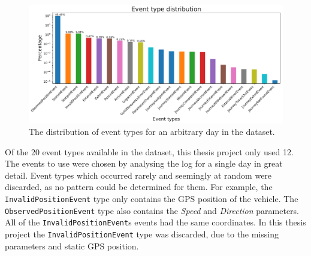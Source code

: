 \begin{figure}[t!]
    \centering
    \includegraphics[width=\textwidth]{figures/types_barplot}
    \caption[The distribution of event types for an arbitrary day in the dataset]
    {\small The distribution of event types for an arbitrary day in the dataset.}
    \label{fig:types-barplot}
\end{figure}

Of the 20 event types available in the dataset, this thesis project only used 12.
The events to use were chosen by analysing the log for a single day in great detail.
Event types which occurred rarely and seemingly at random were discarded, as no pattern could be determined for them.
For example, the \texttt{InvalidPositionEvent} type only contains the GPS position of the vehicle.
The \texttt{ObservedPositionEvent} type also contains the \textit{Speed} and \textit{Direction} parameters.
All of the \texttt{InvalidPositionEvent}s events had the same coordinates.
In this thesis project the \texttt{InvalidPositionEvent} type was discarded, due to the missing parameters and static GPS position.

